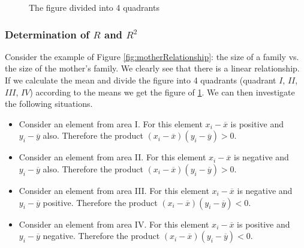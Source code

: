 
\begin{figure}[t]%
  \caption{The figure divided into 4 quadrants}%
  \label{fig:quadrants}%
\end{figure}

\subsubsection{Determination of $R$ and $R^{2}$}
\label{sec:determination-coefficient}
Consider the example of Figure \ref{fig:motherRelationship}: the size of a family vs. the size of the mother's family. We clearly see that there is a linear relationship. If we calculate the mean and divide the figure into 4 quadrants (quadrant $I$, $II$, $III$, $IV$) according to the means we get the figure of \ref{fig:quadrants}. We can then investigate the following situations.

\begin{itemize}
  \item Consider an element from area I. For this element $x_{i} - \overline{x}$ is positive and $y_{i} - \overline{y}$ also. Therefore the product $(x_{i} - \overline{x}) (y_{i} - \overline{y}) > 0$.
  \item Consider an element from area II. For this element $x_{i} - \overline{x}$ is negative and $y_{i} - \overline{y}$ also. Therefore the product $(x_{i} - \overline{x}) (y_{i} - \overline{y}) > 0$.
  \item Consider an element from area III. For this element $x_{i} - \overline{x}$  is negative and $y_{i} - \overline{y}$ positive. Therefore the product $(x_{i} - \overline{x}) (y_{i} - \overline{y}) < 0$.
  \item Consider an element from area IV. For this element $x_{i} - \overline{x}$ is positive and $y_{i} - \overline{y}$ negative. Therefore the product $(x_{i} - \overline{x}) (y_{i} - \overline{y}) < 0$.
\end{itemize}

